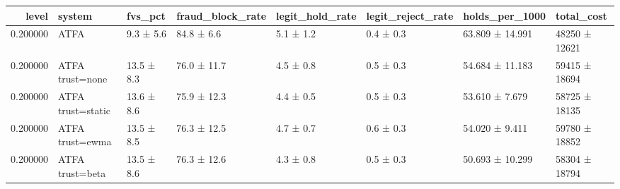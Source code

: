 \begin{tabular}{rlllllll}
\toprule
level & system & fvs\_pct & fraud\_block\_rate & legit\_hold\_rate & legit\_reject\_rate & holds\_per\_1000 & total\_cost \\
\midrule
0.200000 & ATFA & 9.3 ± 5.6 & 84.8 ± 6.6 & 5.1 ± 1.2 & 0.4 ± 0.3 & 63.809 ± 14.991 & 48250 ± 12621 \\
0.200000 & ATFA trust=none & 13.5 ± 8.3 & 76.0 ± 11.7 & 4.5 ± 0.8 & 0.5 ± 0.3 & 54.684 ± 11.183 & 59415 ± 18694 \\
0.200000 & ATFA trust=static & 13.6 ± 8.6 & 75.9 ± 12.3 & 4.4 ± 0.5 & 0.5 ± 0.3 & 53.610 ± 7.679 & 58725 ± 18135 \\
0.200000 & ATFA trust=ewma & 13.5 ± 8.5 & 76.3 ± 12.5 & 4.7 ± 0.7 & 0.6 ± 0.3 & 54.020 ± 9.411 & 59780 ± 18852 \\
0.200000 & ATFA trust=beta & 13.5 ± 8.6 & 76.3 ± 12.6 & 4.3 ± 0.8 & 0.5 ± 0.3 & 50.693 ± 10.299 & 58304 ± 18794 \\
\bottomrule
\end{tabular}
